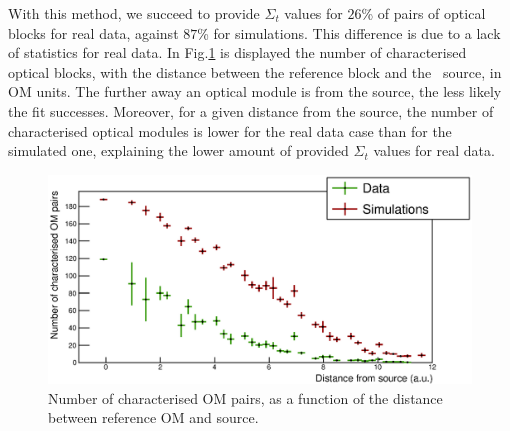 
With this method, we succeed to provide $\Sigma_{t}$ values for $26$\% of pairs of optical blocks for real data, against $87$\% for simulations.
This difference is due to a lack of statistics for real data.
In Fig.\ref{fig:Co_sigma_distance} is displayed the number of characterised optical blocks, with the distance between the reference block and the \Co\ source, in OM units.
The further away an optical module is from the source, the less likely the fit successes.
Moreover, for a given distance from the source, the number of characterised optical modules is lower for the real data case than for the simulated one, explaining the lower amount of provided $\Sigma_{t}$ values for real data.
\begin{figure}[h]
  \centering
  \includegraphics[width=15cm]{commissioning/fig_commissioning/Co_sigma_distance.eps}
  \caption{Number of characterised OM pairs, as a function of the distance between reference OM and source.
    \label{fig:Co_sigma_distance}}
\end{figure}


